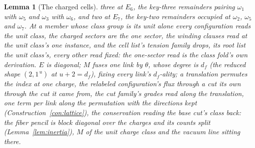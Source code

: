 \documentclass[11pt]{article}
\newtheorem{lemma}{Lemma}
\theoremstyle{definition}
\begin{document}
\begin{lemma}[The charged cells]
three at $E_6$, the key-three remainders pairing $\omega_1$ with
$\omega_5$ and $\omega_3$ with $\omega_6$, and two at $E_7$, the
key-two remainders occupied at $\omega_2$, $\omega_5$ and
$\omega_7$. At a
member whose class group is its unit alone every configuration
reads the unit class, the charged sectors are the one sector, the
winding clauses read at the unit class's one instance, and the
cell list's tension family drops, its root list the unit
class's, every other read fixed: the one-sector read is the class
fold's own derivation.
$E$ is diagonal; $M$ fuses one link by $\theta$, whose degree is $d_f$
(the reduced shape $(2,1^{\,u})$ at $u+2=d_f$), fixing every link's
$d_f$-ality; a
translation permutes the index at one charge, the relabeled
configuration's flux through a cut its own through the cut it came
from, the cut family's grades read along the translation, one
term per link along the permutation with the directions kept
(Construction~\ref{con:lattice}), the conservation reading the base
cut's class back: the fiber pencil is block diagonal over
the charges and its counts split (Lemma~\ref{lem:inertia}), $M$ of
the unit charge class and the vacuum line sitting there.


\end{lemma}
\end{document}
